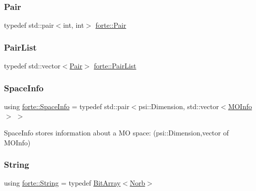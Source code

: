 \mbox{\label{namespaceforte_adfa942eeeeb54ae31f5d6f4d1e4e0641}} 
\subsubsection{\texorpdfstring{Pair}{Pair}}
{\footnotesize\ttfamily typedef std\+::pair$<$int, int$>$ \mbox{\hyperlink{namespaceforte_adfa942eeeeb54ae31f5d6f4d1e4e0641}{forte\+::\+Pair}}}

\mbox{\label{namespaceforte_a3aa026a4f915fc1877b007cc1aab0e3b}} 
\subsubsection{\texorpdfstring{Pair\+List}{PairList}}
{\footnotesize\ttfamily typedef std\+::vector$<$\mbox{\hyperlink{namespaceforte_adfa942eeeeb54ae31f5d6f4d1e4e0641}{Pair}}$>$ \mbox{\hyperlink{namespaceforte_a3aa026a4f915fc1877b007cc1aab0e3b}{forte\+::\+Pair\+List}}}

\mbox{\label{namespaceforte_a5409f5af2d60d63681bfac1017b8e226}} 
\subsubsection{\texorpdfstring{Space\+Info}{SpaceInfo}}
{\footnotesize\ttfamily using \mbox{\hyperlink{namespaceforte_a5409f5af2d60d63681bfac1017b8e226}{forte\+::\+Space\+Info}} = typedef std\+::pair$<$psi\+::\+Dimension, std\+::vector$<$\mbox{\hyperlink{namespaceforte_aba0d18f1ff36b478ecf2db631246e120}{M\+O\+Info}}$>$ $>$}



Space\+Info stores information about a MO space\+: (psi\+::\+Dimension,vector of M\+O\+Info) 

\mbox{\label{namespaceforte_a840d1bfd3a8b3c16e09979212f37313f}} 
\subsubsection{\texorpdfstring{String}{String}}
{\footnotesize\ttfamily using \mbox{\hyperlink{namespaceforte_a840d1bfd3a8b3c16e09979212f37313f}{forte\+::\+String}} = typedef \mbox{\hyperlink{classforte_1_1_bit_array}{Bit\+Array}}$<$\mbox{\hyperlink{namespaceforte_ac7cda07e927e5e88a2c8c754044915e2}{Norb}}$>$}

